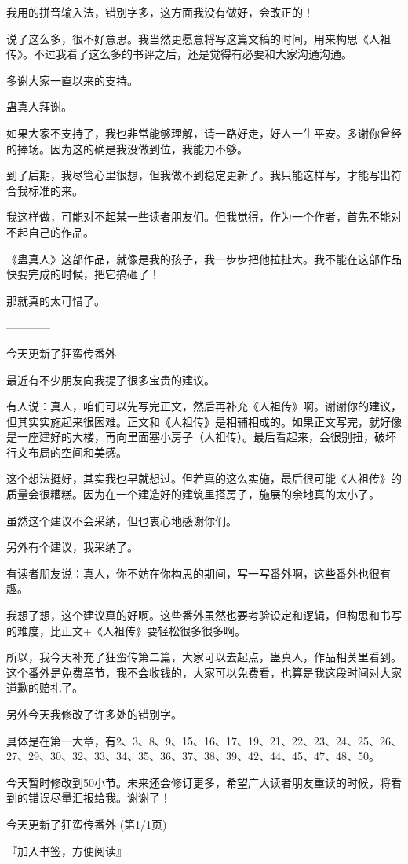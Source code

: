 \begin{this_body}
我用的拼音输入法，错别字多，这方面我没有做好，会改正的！

说了这么多，很不好意思。我当然更愿意将写这篇文稿的时间，用来构思《人祖传》。不过我看了这么多的书评之后，还是觉得有必要和大家沟通沟通。

多谢大家一直以来的支持。

蛊真人拜谢。

如果大家不支持了，我也非常能够理解，请一路好走，好人一生平安。多谢你曾经的捧场。因为这的确是我没做到位，我能力不够。

到了后期，我尽管心里很想，但我做不到稳定更新了。我只能这样写，才能写出符合我标准的来。

我这样做，可能对不起某一些读者朋友们。但我觉得，作为一个作者，首先不能对不起自己的作品。

《蛊真人》这部作品，就像是我的孩子，我一步步把他拉扯大。我不能在这部作品快要完成的时候，把它搞砸了！

那就真的太可惜了。

------------

今天更新了狂蛮传番外

最近有不少朋友向我提了很多宝贵的建议。

有人说：真人，咱们可以先写完正文，然后再补充《人祖传》啊。谢谢你的建议，但其实实施起来很困难。正文和《人祖传》是相辅相成的。如果正文写完，就好像是一座建好的大楼，再向里面塞小房子（人祖传）。最后看起来，会很别扭，破坏行文布局的空间和美感。

这个想法挺好，其实我也早就想过。但若真的这么实施，最后很可能《人祖传》的质量会很糟糕。因为在一个建造好的建筑里搭房子，施展的余地真的太小了。

虽然这个建议不会采纳，但也衷心地感谢你们。

另外有个建议，我采纳了。

有读者朋友说：真人，你不妨在你构思的期间，写一写番外啊，这些番外也很有趣。

我想了想，这个建议真的好啊。这些番外虽然也要考验设定和逻辑，但构思和书写的难度，比正文+《人祖传》要轻松很多很多啊。

所以，我今天补充了狂蛮传第二篇，大家可以去起点，蛊真人，作品相关里看到。这个番外是免费章节，我不会收钱的，大家可以免费看，也算是我这段时间对大家道歉的赔礼了。

另外今天我修改了许多处的错别字。

具体是在第一大章，有2、3、8、9、15、16、17、19、21、22、23、24、25、26、27、29、30、32、33、34、35、36、37、38、39、42、44、45、47、48、50。

今天暂时修改到50小节。未来还会修订更多，希望广大读者朋友重读的时候，将看到的错误尽量汇报给我。谢谢了！

今天更新了狂蛮传番外 (第1/1页)

『加入书签，方便阅读』

\end{this_body}

